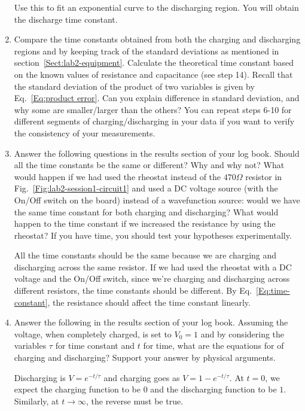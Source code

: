 \documentclass[12pt]{report}
\begin{document}
\begin{enumerate}
Use this to fit an exponential curve to the discharging region. You will obtain the discharge time constant.
\item Compare the time constants obtained from both the charging and discharging regions and by keeping track of the standard deviations as mentioned in section~\ref{Sect:lab2-equipment}. Calculate the theoretical time constant based on the known values of resistance and capacitance (see step 14). Recall that the standard deviation of the product of two variables is given by Eq.~\eqref{Eq:product error}. Can you explain difference in standard deviation, and why some are smaller/larger than the others? You can repeat steps 6-10 for different segments of charging/discharging in your data if you want to verify the consistency of your measurements.
\item Answer the following questions in the results section of your log book. Should all the time constants be the same or different? Why and why not? What would happen if we had used the rheostat instead of the $470\Omega$ resistor in Fig.~\ref{Fig:lab2-session1-circuit1} and used a DC voltage source (with the On/Off switch on the board) instead of a wavefunction source: would we have the same time constant for both charging and discharging? What would happen to the time constant if we increased the resistance by using the rheostat? If you have time, you should test your hypotheses experimentally.

\begin{tcolorbox}[title=Answer]
All the time constants should be the same because we are charging and discharging across the same resistor. If we had used the rheostat with a DC voltage and the On/Off switch, since we're charging and discharging across different resistors, the time constants should be different. By Eq.~\eqref{Eq:time-constant}, the resistance should affect the time constant linearly.
\end{tcolorbox}

\item Answer the following in the results section of your log book. Assuming the voltage, when completely charged, is set to $V_0 = 1$ and by considering the variables $\tau$ for time constant and $t$ for time, what are the equations for of charging and discharging? Support your answer by physical arguments.

\begin{tcolorbox}[title=Answer]
Discharging is $V = e^{-t/\tau}$ and charging goes as $V=1-e^{-t/\tau}$. At $t=0$, we expect the charging function to be $0$ and the discharging function to be $1$. Similarly, at $t\rightarrow \infty$, the reverse must be true.
\end{tcolorbox}


\end{enumerate}
\end{document}
